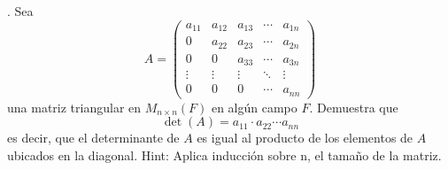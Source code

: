 . Sea
\[
A=\left(\begin{array}{ccccc}
a_{11} & a_{12} & a_{13} & \cdots & a_{1 n} \\
0 & a_{22} & a_{23} & \cdots & a_{2 n} \\
0 & 0 & a_{33} & \cdots & a_{3 n} \\
\vdots & \vdots & \vdots & \ddots & \vdots \\
0 & 0 & 0 & \cdots & a_{n n}
\end{array}\right)
\]
una matriz triangular en \( M_{n \times n}(F) \) en algún campo \( F \). Demuestra que
\[
\operatorname{det}(A)=a_{11} \cdot a_{22} \cdots a_{n n}
\]
es decir, que el determinante de \( A \) es igual al producto de los elementos de \( A \) ubicados en la diagonal.
Hint: Aplica inducción sobre n, el tamaño de la matriz. \\


